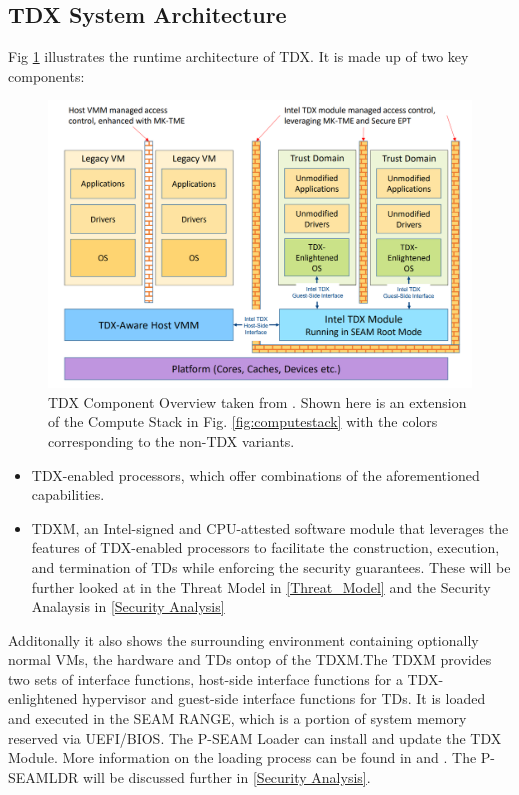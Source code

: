 \subsection{TDX System Architecture}
\label{TDX Architecture}
Fig \ref{fig:component-overview} illustrates the runtime architecture of \Gls{TDX}. It is made up of two key components: 
\begin{figure}
\centering
\includegraphics[width=\textwidth]{figures/TDX-Component-Overview}
\caption{TDX Component Overview taken from \cite[p.~19]{noauthor_tdx-module-10-public-specpdf_nodate}. Shown here is an extension of the Compute Stack in Fig. \ref{fig:computestack} with the colors corresponding to the non-TDX variants.}
\label{fig:component-overview}
\end{figure}
\begin{itemize}
    \item \Gls{TDX}-enabled processors, which offer combinations of the aforementioned capabilities.
    \item \Gls{TDXM}, an Intel-signed and CPU-attested software module that leverages the features of \Gls{TDX}-enabled processors to facilitate the construction, execution, and termination of TDs while enforcing the security guarantees. These will be further looked at in the Threat Model in \cref{Threat_Model} and the Security Analaysis in \cref{Security Analysis}
\end{itemize}
Additonally it also shows the surrounding environment containing optionally normal VMs, the hardware and TDs ontop of the \Gls{TDXM}.The \Gls{TDXM} provides two sets of interface functions, host-side interface functions for a TDX-enlightened hypervisor and guest-side interface functions for TDs. It is loaded and executed in the SEAM RANGE, which is a portion of system memory reserved via UEFI/BIOS. The P-SEAM Loader can install and update the TDX Module. More information on the loading process can be found in \cite{noauthor_white_nodate} and \cite{noauthor_tdx-module-10-public-specpdf_nodate}. The P-SEAMLDR will be discussed further in \ref{Security Analysis}.
